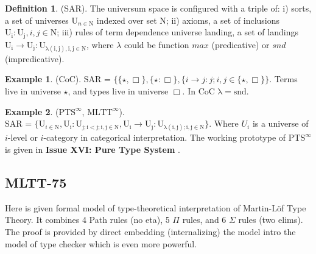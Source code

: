 \documentclass{article}
\theoremstyle{definition}
\newtheorem{definition}{Definition}
\newtheorem{example}{Example}
\begin{document}
\begin{definition} (SAR). The universum space is configured with a triple of:
i) sorts, a set of universes  $\mathrm{U}_{n \in \mathrm{N}}$ indexed over set N;
ii) axioms, a set of inclusions {\bf $\mathrm{U_i : U_j}, i,j \in \mathrm{N}$};
iii) rules of term dependence universe landing, a set of landings
$\mathrm{U_i} \rightarrow \mathrm{U_j} : \mathrm{U_{\lambda(i,j), i,j \in \mathrm{N}}}$, where $\lambda$ could be function $max$ (predicative) or $snd$ (impredicative).
\end{definition}

\begin{example} (CoC). SAR = $\{ \{\star , \Box \},\{ \star : \Box \},
        \{ i \rightarrow j : j; i, j \in \{ \star, \Box \}
        \}$. Terms live in universe $\star$, and types live in universe $\Box$. In CoC $\mathrm{\lambda=snd}$.
\end{example}

\begin{example} ($\mathrm{PTS}^\infty$, $\mathrm{MLTT}^\infty$).\\ SAR = $\{ \mathrm{U}_{i \in \mathrm{N}},
    \mathrm{U_i : U_{j; i < j; i,j \in N}},
    \mathrm{U_i} \rightarrow \mathrm{U_j} : \mathrm{U_{\lambda(i,j); i,j \in \mathrm{N}}}
    \}$. Where $U_i$ is a universe of $i$-level or $i$-category in categorical interpretation.
    The working prototype of $\mathrm{PTS}^\infty$ is given in
    {\bf Issue XVI: Pure Type System} \cite{Tonpa18}.
\end{example}


\newpage
\subsection{MLTT-75}

Here is given formal model of type-theoretical interpretation of Martin-Löf Type Theory.
It combines 4 Path rules (no eta), 5 $\Pi$ rules, and 6 $\Sigma$ rules (two elims).
The proof is provided by direct embedding (internalizing) the model intro the model
of type checker which is even more powerful.
\end{document}
